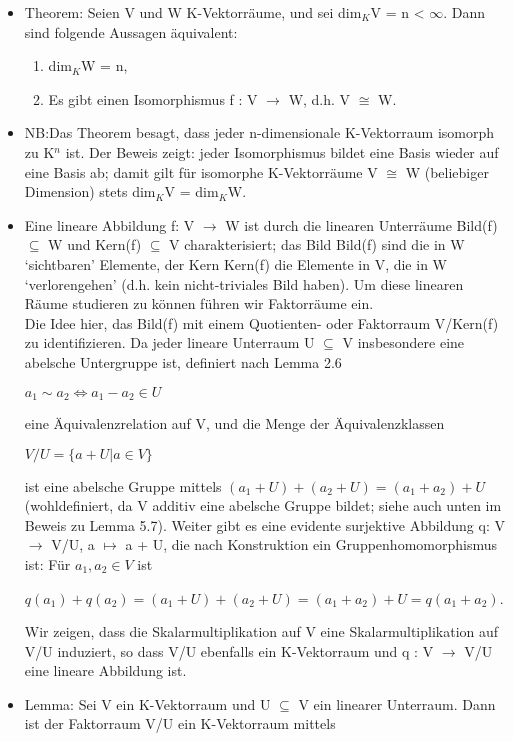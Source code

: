 \begin{itemize}
\begin{compactenum}
\end{compactenum}
\item Theorem: Seien V und W K-Vektorräume, und sei dim$_K$V = n < $\infty$. Dann sind folgende Aussagen äquivalent:
\begin{enumerate}
\item dim$_K$W = n,
\item Es gibt einen Isomorphismus f : V $\to$ W, d.h. V $\cong$ W.
\end{enumerate}
\item NB:Das Theorem besagt, dass jeder n-dimensionale K-Vektorraum isomorph zu K$^n$ ist. Der Beweis zeigt: jeder Isomorphismus bildet eine Basis wieder auf eine Basis ab; damit gilt für isomorphe K-Vektorräume V $\cong$ W (beliebiger Dimension) stets dim$_K$V = dim$_K$W.
\item Eine lineare Abbildung f: V $\to$ W ist durch die linearen Unterräume Bild(f) $\subseteq$ W und Kern(f) $\subseteq$ V charakterisiert; das Bild Bild(f) sind die in W ‘sichtbaren’ Elemente, der Kern Kern(f) die Elemente in V, die in W ‘verlorengehen’ (d.h. kein nicht-triviales Bild haben). Um diese linearen Räume studieren zu können führen wir Faktorräume ein.\\
Die Idee hier, das Bild(f) mit einem Quotienten- oder Faktorraum V/Kern(f) zu identifizieren. Da jeder lineare Unterraum U $\subseteq$ V insbesondere eine abelsche Untergruppe ist, definiert nach Lemma 2.6
\begin{center}
$a_1 \sim a_2 \Leftrightarrow a_1 - a_2 \in U$
\end{center}
eine Äquivalenzrelation auf V, und die Menge der Äquivalenzklassen
\begin{center}
$V /U = \{a + U | a \in V \}$
\end{center}
ist eine abelsche Gruppe mittels $(a_1 + U) + (a_2 + U) = (a_1 + a_2) + U$ (wohldefiniert, da V additiv eine abelsche Gruppe bildet; siehe auch unten im Beweis zu Lemma 5.7). Weiter gibt es eine evidente surjektive Abbildung q: V $\to$ V/U, a $\mapsto$ a + U, die nach Konstruktion ein Gruppenhomomorphismus ist: Für $a_1, a_2 \in V$ ist
\begin{center}
$q(a_1)+q(a_2)=(a_1 +U)+(a_2 +U)=(a_1 +a_2)+U =q(a_1 +a_2)$.
\end{center}
Wir zeigen, dass die Skalarmultiplikation auf V eine Skalarmultiplikation auf V/U induziert, so dass V/U ebenfalls ein K-Vektorraum und q : V $\to$ V/U eine lineare Abbildung ist.
\item Lemma: Sei V ein K-Vektorraum und U $\subseteq$ V ein linearer Unterraum. Dann ist der Faktorraum V/U ein K-Vektorraum mittels

\end{itemize}
